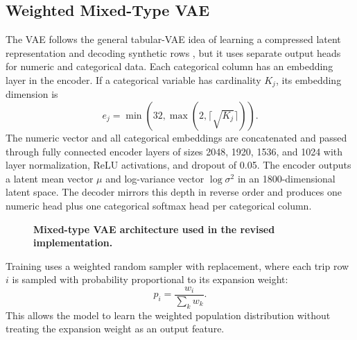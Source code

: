 \documentclass[3p,times,procedia]{elsarticle}
\begin{document}
\subsection{Weighted Mixed-Type VAE}
The VAE follows the general tabular-VAE idea of learning a compressed latent representation and decoding synthetic rows \cite{xu_modeling_2019}, but it uses separate output heads for numeric and categorical data. Each categorical column has an embedding layer in the encoder. If a categorical variable has cardinality $K_j$, its embedding dimension is
\[
e_j=\min(32,\max(2,\lceil\sqrt{K_j}\rceil)).
\]
The numeric vector and all categorical embeddings are concatenated and passed through fully connected encoder layers of sizes 2048, 1920, 1536, and 1024 with layer normalization, ReLU activations, and dropout of 0.05. The encoder outputs a latent mean vector $\mu$ and log-variance vector $\log\sigma^2$ in an 1800-dimensional latent space. The decoder mirrors this depth in reverse order and produces one numeric head plus one categorical softmax head per categorical column.

\begin{figure}[H]
\centering
{}
\caption{\textbf{Mixed-type VAE architecture used in the revised implementation.}}
\label{fig:architecture}
\end{figure}

Training uses a weighted random sampler with replacement, where each trip row $i$ is sampled with probability proportional to its expansion weight:
\[
p_i=\frac{w_i}{\sum_k w_k}.
\]
This allows the model to learn the weighted population distribution without treating the expansion weight as an output feature.
\end{document}

